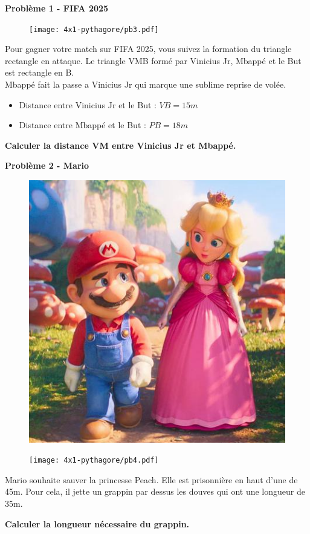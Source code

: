 \textbf{Problème 1 - FIFA 2025} \\

\begin{figure}[H]
  \centering
  \texttt{[image: 4x1-pythagore/pb3.pdf]}
\end{figure}
  
Pour gagner votre match sur FIFA 2025, vous suivez la formation du triangle rectangle en attaque. Le triangle VMB formé par Vinicius Jr, Mbappé et le But est rectangle en B. \\
  
Mbappé fait la passe a Vinicius Jr qui marque une sublime reprise de volée. 
  
\begin{itemize}
  \item Distance entre Vinicius Jr et le But : $VB = 15m$
  \item Distance entre Mbappé et le But : $PB = 18m$
\end{itemize}
  
\textbf{Calculer la distance VM entre Vinicius Jr et Mbappé.} 

\newpage

\begin{multicols}{2} 
  \textbf{Problème 2 - Mario} \\
  
  \begin{figure}[H]
    \centering
    \includegraphics[width=0.3\linewidth]{4x1-pythagore/pb4-mario.png}
  \end{figure}

  \begin{figure}[H]
    \centering
    \texttt{[image: 4x1-pythagore/pb4.pdf]}
  \end{figure}
\end{multicols}

Mario souhaite sauver la princesse Peach. Elle est prisonnière en haut d'une de 45m. Pour cela, il jette un grappin par dessus les douves qui ont une longueur de 35m. 
  
\textbf{Calculer la longueur nécessaire du grappin.} \\

